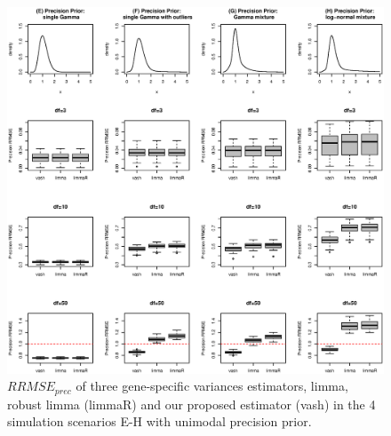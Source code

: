\documentclass{bioinfo}
\begin{document}
\begin{figure}[!hbp]
\includegraphics[width=\linewidth]{relmse2_prec.eps}
\caption{$RRMSE_{prec}$ of three gene-specific variances estimators, limma, robust limma (limmaR) and our proposed estimator (vash) in the 4 simulation scenarios E-H with unimodal precision prior.}
\label{fg:rrmse2}
\end{figure}

\end{document}
